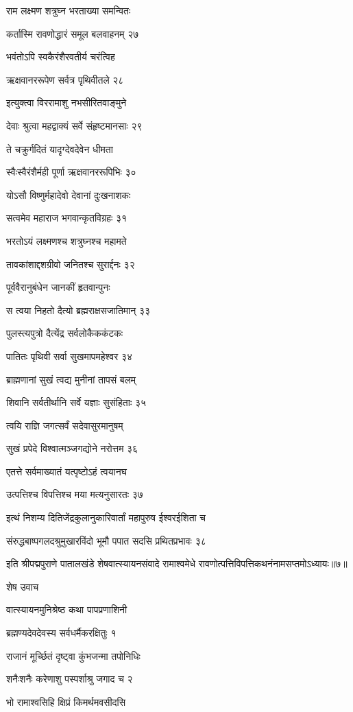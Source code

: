राम लक्ष्मण शत्रुघ्न भरताख्या समन्वितः

कर्तास्मि रावणोद्धारं समूल बलवाहनम् २७

भवंतोऽपि स्वकैरंशैरवतीर्य चरंत्विह

ऋक्षवानररूपेण सर्वत्र पृथिवीतले २८

इत्युक्त्वा विररामाशु नभसीरितवाङ्मुने

देवाः श्रुत्वा महद्वाक्यं सर्वे संहृष्टमानसाः २९

ते चक्रुर्गदितं यादृग्देवदेवेन धीमता

स्वैःस्वैरंशैर्मही पूर्णा ऋक्षवानररूपिभिः ३०

योऽसौ विष्णुर्महादेवो देवानां दुःखनाशकः

सत्वमेव महाराज भगवान्कृतविग्रहः ३१

भरतोऽयं लक्ष्मणश्च शत्रुघ्नश्च महामते

तावकांशाद्दशग्रीवो जनितश्च सुरार्द्दनः ३२

पूर्ववैरानुबंधेन जानकीं हृतवान्पुनः

स त्वया निहतो दैत्यो ब्रह्मराक्षसजातिमान् ३३

पुलस्त्यपुत्रो दैत्येंद्र सर्वलोकैककंटकः

पातितः पृथिवी सर्वा सुखमापमहेश्वर ३४

ब्राह्मणानां सुखं त्वद्य मुनीनां तापसं बलम्

शिवानि सर्वतीर्थानि सर्वे यज्ञाः सुसंहिताः ३५

त्वयि राज्ञि जगत्सर्वं सदेवासुरमानुषम्

सुखं प्रपेदे विश्वात्मञ्जगद्योने नरोत्तम ३६

एतत्ते सर्वमाख्यातं यत्पृष्टोऽहं त्वयानघ

उत्पत्तिश्च विपत्तिश्च मया मत्यनुसारतः ३७

इत्थं निशम्य दितिजेंद्रकुलानुकारिवार्तां महापुरुष ईश्वरईशिता च

संरुद्धबाष्पगलदश्रुमुखारविंदो भूमौ पपात सदसि प्रथितप्रभावः ३८

इति श्रीपद्मपुराणे पातालखंडे शेषवात्स्यायनसंवादे रामाश्वमेधे रावणोत्पत्तिविपत्तिकथनंनामसप्तमोऽध्यायः॥७॥


शेष उवाच

वात्स्यायनमुनिश्रेष्ठ कथा पापप्रणाशिनी

ब्रह्मण्यदेवदेवस्य सर्वधर्मैकरक्षितुः १

राजानं मूर्च्छितं दृष्ट्वा कुंभजन्मा तपोनिधिः

शनैःशनैः करेणाशु पस्पर्शाश्रु जगाद च २

भो रामाश्वसिहि क्षिप्रं किमर्थमवसीदसि

